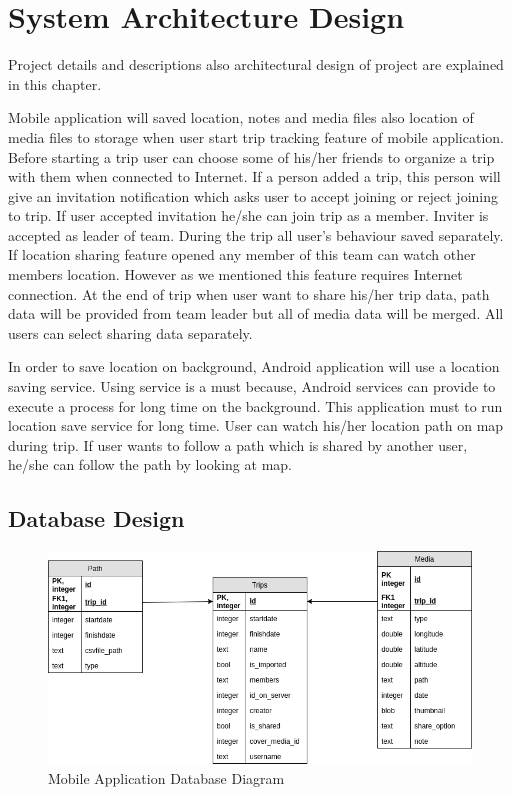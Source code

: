 \chapter{System Architecture Design}

Project details and descriptions also architectural design of project are explained in this chapter.

Mobile application will saved location, notes and media files also location of media files to storage when user start trip tracking feature of mobile application. Before starting a trip user can choose some of his/her friends to organize a trip with them when connected to Internet. If a person added a trip, this person will give an invitation notification which asks user to accept joining or reject joining to trip. If user accepted invitation he/she can join trip as a member. Inviter is accepted as leader of team. During the trip all user's behaviour saved separately. If location sharing feature opened any member of this team can watch other members location. However as we mentioned this feature requires Internet connection. At the end of trip when user want to share his/her trip data, path data will be provided from team leader but all of media data will be merged. All users can select sharing data separately.

In order to save location on background, Android application will use a location saving service. Using service is a must because, Android services can provide to execute a process for long time on the background. This application must to run location save service for long time. User can watch his/her location path on map during trip. If user wants to follow a path which is shared by another user, he/she can follow the path by looking at map.

\newpage
\section{Database Design}

\begin{figure}[!htbp]
\centering
\includegraphics[width=\textwidth]{projectChapters/images/android_database.png}
\caption{Mobile Application Database Diagram}
\label{fig:roles}
\end{figure}

